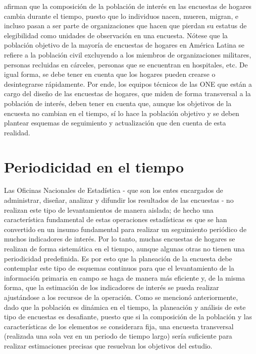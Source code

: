 \documentclass[
  12pt,
  spanish,
]{book}
\begin{document}
\citet[pág. 105]{Duncan_Kalton_1987} afirman que la composición de la población de interés en las encuestas de hogares cambia durante el tiempo, puesto que lo individuos nacen, mueren, migran, e incluso pasan a ser parte de organizaciones que hacen que pierdan su estatus de elegibilidad como unidades de observación en una encuesta. Nótese que la población objetivo de la mayoría de encuestas de hogares en América Latina se refiere a la población civil excluyendo a los miembros de organizaciones militares, personas recluidas en cárceles, personas que se encuentran en hospitales, etc. De igual forma, se debe tener en cuenta que los hogares pueden crearse o desintegrarse rápidamente. Por ende, los equipos técnicos de las ONE que están a cargo del diseño de las encuestas de hogares, que miden de forma transversal a la población de interés, deben tener en cuenta que, aunque los objetivos de la encuesta no cambian en el tiempo, sí lo hace la población objetivo y se deben plantear esquemas de seguimiento y actualización que den cuenta de esta realidad.

\hypertarget{periodicidad-en-el-tiempo}{%
\section{Periodicidad en el tiempo}\label{periodicidad-en-el-tiempo}}

Las Oficinas Nacionales de Estadística - que son los entes encargados de administrar, diseñar, analizar y difundir los resultados de las encuestas - no realizan este tipo de levantamientos de manera aislada; de hecho una característica fundamental de estas operaciones estadísticas es que se han convertido en un insumo fundamental para realizar un seguimiento periódico de muchos indicadores de interés. Por lo tanto, muchas encuestas de hogares se realizan de forma sistemática en el tiempo, aunque algunas otras no tienen una periodicidad predefinida. Es por esto que la planeación de la encuesta debe contemplar este tipo de esquemas continuos para que el levantamiento de la información primaria en campo se haga de manera más eficiente y, de la misma forma, que la estimación de los indicadores de interés se pueda realizar ajustándose a los recursos de la operación. Como se mencionó anteriormente, dado que la población es dinámica en el tiempo, la planeación y análisis de este tipo de encuestas es desafiante, puesto que si la composición de la población y las características de los elementos se considerara fija, una encuesta transversal (realizada una sola vez en un periodo de tiempo largo) sería suficiente para realizar estimaciones precisas que resuelvan los objetivos del estudio.
\end{document}
